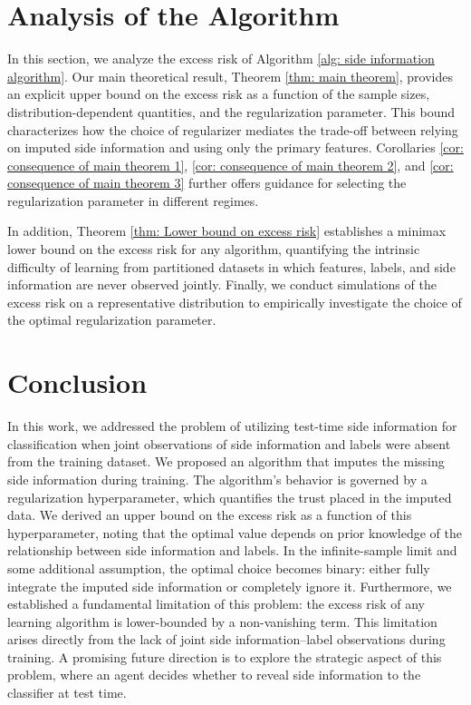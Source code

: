 \documentclass[smallextended]{svjour3}       %
\begin{document}






\section{Analysis of the Algorithm}

In this section, we analyze the excess risk of Algorithm \ref{alg: side information algorithm}. Our main theoretical result, Theorem \ref{thm: main theorem}, provides an explicit upper bound on the excess risk as a function of the sample sizes, distribution-dependent quantities, and the regularization parameter. This bound characterizes how the choice of regularizer mediates the trade-off between relying on imputed side information and using only the primary features. Corollaries \ref{cor: consequence of main theorem 1}, \ref{cor: consequence of main theorem 2}, and \ref{cor: consequence of main theorem 3} further offers guidance for selecting the regularization parameter in different regimes.

In addition, Theorem \ref{thm: Lower bound on excess risk} establishes a minimax lower bound on the excess risk for any algorithm, quantifying the intrinsic difficulty of learning from partitioned datasets in which features, labels, and side information are never observed jointly. Finally, we conduct simulations of the excess risk on a representative distribution to empirically investigate the choice of the optimal regularization parameter.








\section{Conclusion}

In this work, we addressed the problem of utilizing test-time side information for classification when joint observations of side information and labels were absent from the training dataset. We proposed an algorithm that imputes the missing side information during training. The algorithm's behavior is governed by a regularization hyperparameter, which quantifies the trust placed in the imputed data. We derived an upper bound on the excess risk as a function of this hyperparameter, noting that the optimal value depends on prior knowledge of the relationship between side information and labels. In the infinite-sample limit and some additional assumption, the optimal choice becomes binary: either fully integrate the imputed side information or completely ignore it. Furthermore, we established a fundamental limitation of this problem: the excess risk of any learning algorithm is lower-bounded by a non-vanishing term. This limitation arises directly from the lack of joint side information–label observations during training. A promising future direction is to explore the strategic aspect of this problem, where an agent decides whether to reveal side information to the classifier at test time.
\end{document}
